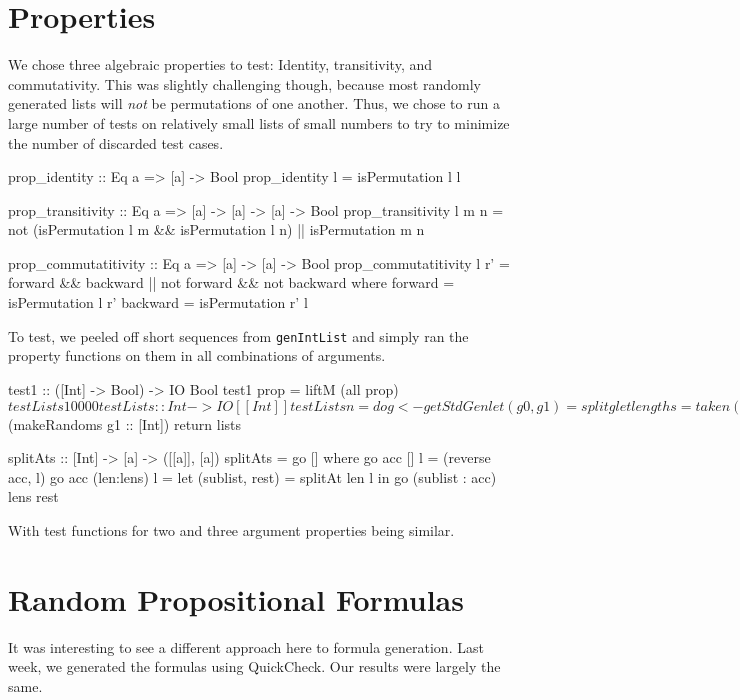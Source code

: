 \documentclass[a4paper,10pt]{article}
\begin{document}
\section{Properties}
We chose three algebraic properties to test: Identity, transitivity, and commutativity. This was slightly challenging though, because most randomly generated lists will \emph{not} be permutations of one another. Thus, we chose to run a large number of tests on relatively small lists of small numbers to try to minimize the number of discarded test cases.
\begin{code}
prop_identity :: Eq a => [a] -> Bool
prop_identity l = isPermutation l l

prop_transitivity :: Eq a => [a] -> [a] -> [a] -> Bool
prop_transitivity l m n = not (isPermutation l m && isPermutation l n) || isPermutation m n

prop_commutatitivity :: Eq a => [a] -> [a] -> Bool
prop_commutatitivity l r' = forward && backward || not forward && not backward
    where forward  = isPermutation l r'
          backward = isPermutation r' l
\end{code}
To test, we peeled off short sequences from \texttt{genIntList} and simply ran the property functions on them in all combinations of arguments.

\begin{code}
test1 :: ([Int] -> Bool) -> IO Bool
test1 prop = liftM (all prop) $ testLists 10000

testLists :: Int -> IO [[Int]]
testLists n = do
    g <- getStdGen
    let (g0, g1) = split g
    let lengths = take n (makeRandoms g0 :: [Int])
    let lists = fst . splitAts lengths $ (makeRandoms g1 :: [Int])
    return lists

splitAts :: [Int] -> [a] -> ([[a]], [a])
splitAts = go []
  where
    go acc []         l = (reverse acc, l)
    go acc (len:lens) l = let (sublist, rest) = splitAt len l
                          in go (sublist : acc) lens rest
\end{code}
With test functions for two and three argument properties being similar.

\section{Random Propositional Formulas}

It was interesting to see a different approach here to formula generation. Last week, we generated the formulas using QuickCheck. Our results were largely the same.
\end{document}
